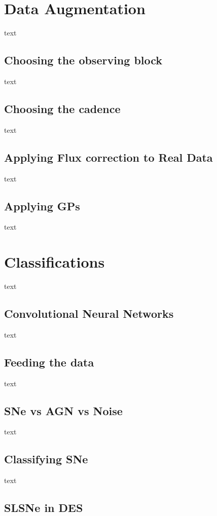 \section{Data Augmentation} \label{sec:DataAugmentation}
text
\subsection{Choosing the observing block}
text
\subsection{Choosing the cadence}
text
\subsection{Applying Flux correction to Real Data}
text
\subsection{Applying GPs}
text

\section{Classifications} \label{sec:CNN}
text
\subsection{Convolutional Neural Networks}
text
\subsection{Feeding the data}
text
\subsection{SNe vs AGN vs Noise}
text
\subsection{Classifying SNe}
text
\subsection{SLSNe in DES}
